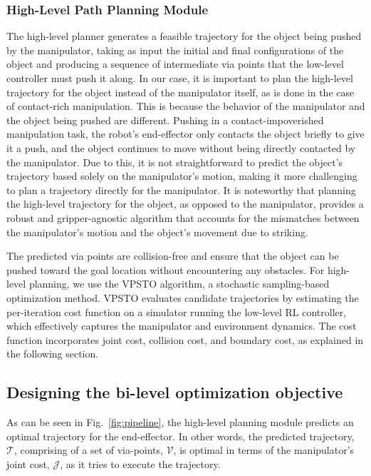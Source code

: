 \subsubsection{High-Level Path Planning Module}
\label{sec:path-planning-module}
The high-level planner generates a feasible trajectory for the object being pushed by the manipulator, taking as input the initial and final configurations of the object and producing a sequence of intermediate via points that the low-level controller must push it along. In our case, it is important to plan the high-level trajectory for the object instead of the manipulator itself, as is done in the case of contact-rich manipulation. This is because the behavior of the manipulator and the object being pushed are different. Pushing in a contact-impoverished manipulation task, the robot's end-effector only contacts the object briefly to give it a push, and the object continues to move without being directly contacted by the manipulator. Due to this, it is not straightforward to predict the object's trajectory based solely on the manipulator's motion, making it more challenging to plan a trajectory directly for the manipulator. It is noteworthy that planning the high-level trajectory for the object, as opposed to the manipulator, provides a robust and gripper-agnostic algorithm that accounts for the mismatches between the manipulator's motion and the object's movement due to striking.

The predicted via points are collision-free and ensure that the object can be pushed toward the goal location without encountering any obstacles. For high-level planning, we use the VPSTO algorithm, a stochastic sampling-based optimization method. VPSTO evaluates candidate trajectories by estimating the per-iteration cost function on a simulator running the low-level RL controller, which effectively captures the manipulator and environment dynamics. The cost function incorporates joint cost, collision cost, and boundary cost, as explained in the following section.

\subsection{Designing the bi-level optimization objective}

As can be seen in Fig.~\ref{fig:pipeline}, the high-level planning module predicts an optimal trajectory for the end-effector. In other words, the predicted trajectory, $\mathcal{T}$, comprising of a set of via-points, $\mathcal{V}$, is optimal in terms of the manipulator's joint cost, $\mathcal{J}$, as it tries to execute the trajectory. 

